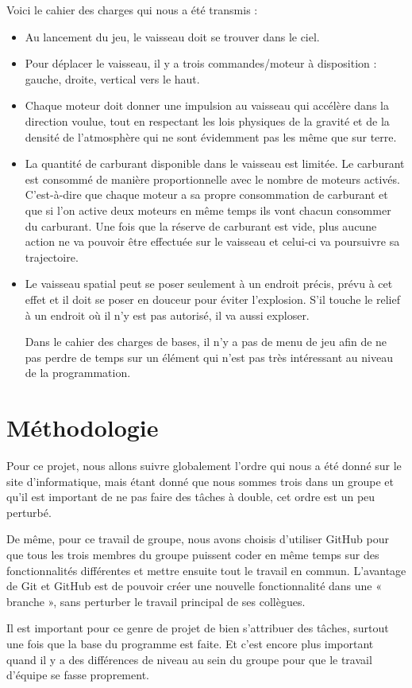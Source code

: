 Voici le cahier des charges qui nous a été transmis :
\begin{itemize}
\item	Au lancement du jeu, le vaisseau doit se trouver dans le ciel.
\item	Pour déplacer le vaisseau, il y a trois commandes/moteur à disposition : gauche, droite, vertical vers le haut.
\item	Chaque moteur doit donner une impulsion au vaisseau qui accélère dans la direction voulue, tout en respectant les lois physiques de la gravité et de la densité de l’atmosphère qui ne sont évidemment pas les même que sur terre.
\item	La quantité de carburant disponible dans le vaisseau est limitée. Le carburant est consommé de manière proportionnelle avec le nombre de moteurs activés. C’est-à-dire que chaque moteur a sa propre consommation de carburant et que si l’on active deux moteurs en même temps ils vont chacun consommer du carburant. Une fois que la réserve de carburant est vide, plus aucune action ne va pouvoir être effectuée sur le vaisseau et celui-ci va poursuivre sa trajectoire.
\item	Le vaisseau spatial peut se poser seulement à un endroit précis, prévu à cet effet et il doit se poser en douceur pour éviter l’explosion. S’il touche le relief à un endroit où il n’y est pas autorisé, il va aussi exploser.

Dans le cahier des charges de bases, il n’y a pas de menu de jeu afin de ne pas perdre de temps sur un élément qui n’est pas très intéressant au niveau de la programmation.
\end{itemize}

\section{Méthodologie}
Pour ce projet, nous allons suivre globalement l’ordre qui nous a été donné sur le site d’informatique, mais étant donné que nous sommes trois dans un groupe et qu’il est important de ne pas faire des tâches à double, cet ordre est un peu perturbé.

De même, pour ce travail de groupe, nous avons choisis d’utiliser GitHub pour que tous les trois membres du groupe puissent coder en même temps sur des fonctionnalités différentes et mettre ensuite tout le travail en commun. L’avantage de Git et GitHub est de pouvoir créer une nouvelle fonctionnalité dans une « branche », sans perturber le travail principal de ses collègues.

Il est important pour ce genre de projet de bien s’attribuer des tâches, surtout une fois que la base du programme est faite. Et c’est encore plus important quand il y a des différences de niveau au sein du groupe pour que le travail d’équipe se fasse proprement.
